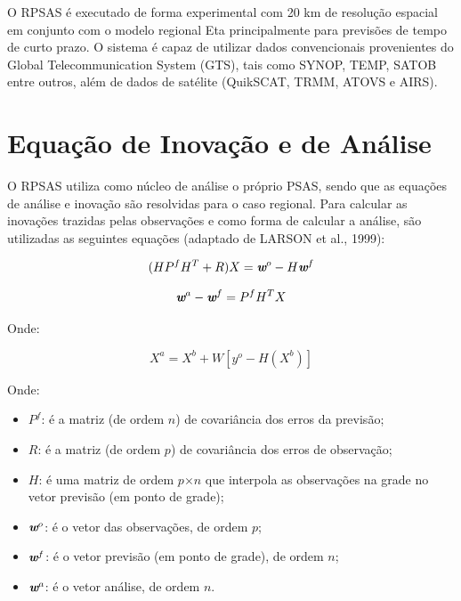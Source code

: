 O RPSAS é executado de forma experimental com 20 km de resolução espacial em conjunto com o modelo regional Eta principalmente para previsões de tempo de curto prazo. O sistema é capaz de utilizar dados convencionais provenientes do Global Telecommunication System (GTS), tais como SYNOP, TEMP, SATOB entre outros, além de dados de satélite (QuikSCAT, TRMM, ATOVS e AIRS).

\section{Equação de Inovação e de Análise}
\label{ss:eqinovanl}

O RPSAS utiliza como núcleo de análise o próprio PSAS, sendo que as equações de análise e inovação são resolvidas para o caso regional. Para calcular as inovações trazidas pelas observações e como forma de calcular a análise, são utilizadas as seguintes equações (adaptado de LARSON et al., 1999):

\begin{equation}
(HP^{f}H^{T}+R)X=\textit{\textbf{w}}^o-H\textit{\textbf{w}}^f
\label{form06}
\end{equation}

\begin{equation}
\textit{\textbf{w}}^a-\textit{\textbf{w}}^f=P^{f}H^{T}X
\label{form07}
\end{equation}

Onde:

\begin{equation}
X^{a}=X^{b}+W[y^{o}-H(X^{b})]
\label{form08}
\end{equation}

Onde:

\begin{itemize}
\item $P^{f}$: é a matriz (de ordem $n$) de covariância dos erros da previsão;
\item $R$: é a matriz (de ordem $p$) de covariância dos erros de observação;
\item $H$: é uma matriz de ordem $p$$\times$$n$ que interpola as observações na grade no vetor previsão (em ponto de grade);
\item $\textit{\textbf{w}}^o$: é o vetor das observações, de ordem $p$;
\item $\textit{\textbf{w}}^f$: é o vetor previsão (em ponto de grade), de ordem $n$;
\item $\textit{\textbf{w}}^a$: é o vetor análise, de ordem $n$.
\end{itemize}

